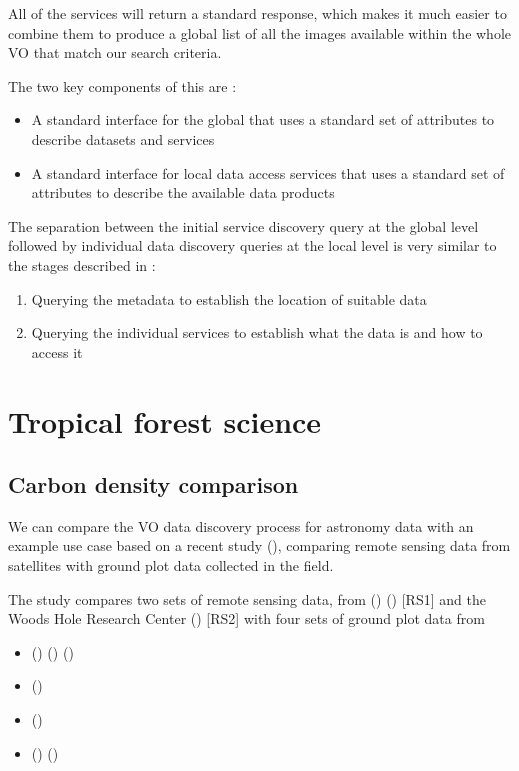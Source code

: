 \documentclass{article}
\begin{document}
All of the \cite{ivoa.sia} services will return a standard response, which makes
it much easier to combine them to produce a global list of all the images available
within the whole VO that match our search criteria.

\noindent
The two key components of this are :
\begin{itemize}
\item A standard interface for the global \cite{ivoa.reg} that uses a standard
set of attributes to describe datasets and services
\item A standard interface for local \cite{ivoa.sia} data access services that
uses a standard set of attributes to describe the available data products
\end{itemize}

The separation between the initial service discovery query at the global
level followed by individual data discovery queries at the local level
is very similar to the stages described in \cite{jones-2006} :
\begin{enumerate}
  \item Querying the metadata to establish the location of suitable data
  \item Querying the individual services to establish what the data is and how to access it
\end{enumerate}

\section{Tropical forest science}

\subsection{Carbon density comparison}

We can compare the VO data discovery process for astronomy data with an example
use case based on a recent study
 (\cite{mitchard-2014}),
comparing remote sensing data from satellites with ground plot data collected
in the field.

The study compares two sets of remote sensing data, from
 (\cite{nasa-jpl-carbon})
 (\cite{saatchi-2011}) [RS1]
and the Woods Hole Research Center
 (\cite{baccini-2012}) [RS2]
with four sets of ground plot data from

\begin{itemize}
\item{} (\cite{rainfor}) (\cite{peacock-2007}) (\cite{malhi-2009})
\item{} (\cite{atdn})
\item{} (\cite{team})
\item{} (\cite{ppbio}) (\cite{pezzini-2012})
\end{itemize}
\end{document}
